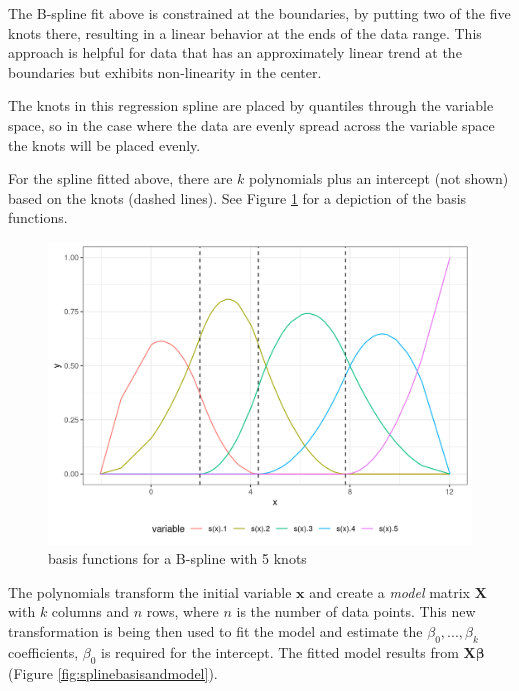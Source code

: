\documentclass[
]{book}
\begin{document}
The B-spline fit above is constrained at the boundaries, by putting two of the five knots there, resulting in a linear behavior at the ends of the data range. This approach is helpful for data that has an approximately linear trend at the boundaries but exhibits non-linearity in the center.

The knots in this regression spline are placed by quantiles through the variable space, so in the case where the data are evenly spread across the variable space the knots will be placed evenly.

For the spline fitted above, there are \(k\) polynomials plus an intercept (not shown) based on the knots (dashed lines). See Figure \ref{fig:splinebasis} for a depiction of the basis functions.

\begin{figure}
\centering
\includegraphics{_bookdown_files/_main_files/figure-html/splinebasis-1.png}
\caption{\label{fig:splinebasis}basis functions for a B-spline with 5 knots}
\end{figure}

The polynomials transform the initial variable \(\mathbf{x}\) and create a \emph{model} matrix \(\mathbf{X}\) with \(k\) columns and \(n\) rows, where \(n\) is the number of data points. This new transformation is being then used to fit the model and estimate the \(\beta_{0}, ... ,\beta_{k}\) coefficients, \(\beta_0\) is required for the intercept. The fitted model results from \(\mathbf{X} \mathbf{\beta}\) (Figure \ref{fig:splinebasisandmodel}).
\end{document}

